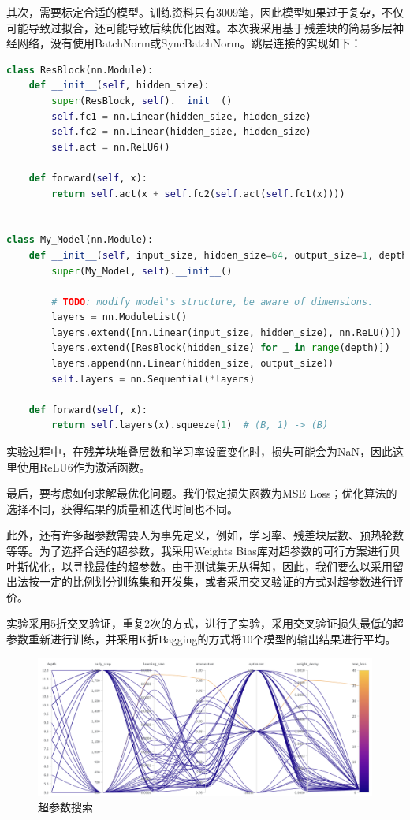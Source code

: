 \documentclass[a4paper,12pt]{ctexart}
\begin{document}
其次，需要标定合适的模型。训练资料只有3009笔，因此模型如果过于复杂，不仅可能导致过拟合，还可能导致后续优化困难。本次我采用基于残差块的简易多层神经网络，没有使用BatchNorm或SyncBatchNorm。跳层连接的实现如下：

\begin{lstlisting}[language={python},caption={模型实现}]
class ResBlock(nn.Module):
    def __init__(self, hidden_size):
        super(ResBlock, self).__init__()
        self.fc1 = nn.Linear(hidden_size, hidden_size)
        self.fc2 = nn.Linear(hidden_size, hidden_size)
        self.act = nn.ReLU6()

    def forward(self, x):
        return self.act(x + self.fc2(self.act(self.fc1(x))))


class My_Model(nn.Module):
    def __init__(self, input_size, hidden_size=64, output_size=1, depth=5):
        super(My_Model, self).__init__()

        # TODO: modify model's structure, be aware of dimensions.
        layers = nn.ModuleList()
        layers.extend([nn.Linear(input_size, hidden_size), nn.ReLU()])
        layers.extend([ResBlock(hidden_size) for _ in range(depth)])
        layers.append(nn.Linear(hidden_size, output_size))
        self.layers = nn.Sequential(*layers)

    def forward(self, x):
        return self.layers(x).squeeze(1)  # (B, 1) -> (B)

\end{lstlisting}

实验过程中，在残差块堆叠层数和学习率设置变化时，损失可能会为NaN，因此这里使用ReLU6作为激活函数。

最后，要考虑如何求解最优化问题。我们假定损失函数为MSE Loss；优化算法的选择不同，获得结果的质量和迭代时间也不同。

此外，还有许多超参数需要人为事先定义，例如，学习率、残差块层数、预热轮数等等。为了选择合适的超参数，我采用Weights Bias库对超参数的可行方案进行贝叶斯优化，以寻找最佳的超参数。由于测试集无从得知，因此，我们要么以采用留出法按一定的比例划分训练集和开发集，或者采用交叉验证的方式对超参数进行评价。

实验采用5折交叉验证，重复2次的方式，进行了实验，采用交叉验证损失最低的超参数重新进行训练，并采用K折Bagging的方式将10个模型的输出结果进行平均。

\begin{figure}[htbp]
    \centering
    \includegraphics[width=0.8\linewidth]{WB.png}
    \caption{超参数搜索}
\end{figure}
\end{document}

